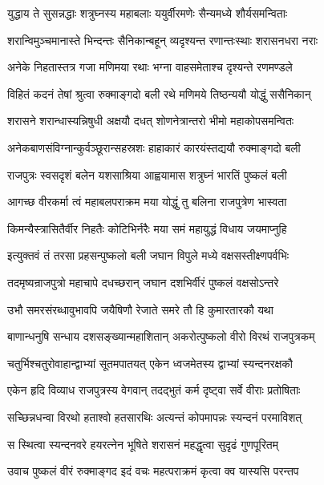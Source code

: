 

\twolineshloka
{युद्धाय ते सुसन्नद्धाः शत्रुघ्नस्य महाबलाः}
{ययुर्वीरमणेः सैन्यमध्ये शौर्यसमन्विताः}%

\twolineshloka
{शरान्विमुञ्चमानास्ते भिन्दन्तः सैनिकान्बहून्}
{व्यदृश्यन्त रणान्तःस्थाः शरासनधरा नराः}%

\twolineshloka
{अनेके निहतास्तत्र गजा मणिमया रथाः}
{भग्ना वाहसमेताश्च दृश्यन्ते रणमण्डले}%

\twolineshloka
{विहितं कदनं तेषां श्रुत्वा रुक्माङ्गदो बली}
{रथे मणिमये तिष्ठन्ययौ योद्धुं ससैनिकान्}%

\twolineshloka
{शरासने शरान्धास्यन्निषुधी अक्षयौ दधत्}
{शोणनेत्रान्तरो भीमो महाकोपसमन्वितः}%

\twolineshloka
{अनेकबाणसंविग्नान्कुर्वञ्छूरान्सहस्रशः}
{हाहाकारं कारयंस्तद्ययौ रुक्माङ्गदो बली}%

\twolineshloka
{राजपुत्रः स्वसदृशं बलेन यशसाश्रिया}
{आह्वयामास शत्रुघ्नं भारतिं पुष्कलं बली}%


\twolineshloka
{आगच्छ वीरकर्मा त्वं महाबलपराक्रम}
{मया योद्धुं तु बलिना राजपुत्रेण भास्वता}%

\twolineshloka
{किमन्यैस्त्रासितैर्वीर निहतैः कोटिभिर्नरैः}
{मया समं महायुद्धं विधाय जयमाप्नुहि}%

\twolineshloka
{इत्युक्तवं तं तरसा प्रहसन्पुष्कलो बली}
{जघान विपुले मध्ये वक्षसस्तीक्ष्णपर्वभिः}%

\twolineshloka
{तदमृष्यन्राजपुत्रो महाचापे दधच्छरान्}
{जघान दशभिर्वीरं पुष्कलं वक्षसोऽन्तरे}%

\twolineshloka
{उभौ समरसंरब्धावुभावपि जयैषिणौ}
{रेजाते समरे तौ हि कुमारतारकौ यथा}%

\twolineshloka
{बाणान्धनुषि सन्धाय दशसङ्ख्यान्महाशितान्}
{अकरोत्पुष्कलो वीरो विरथं राजपुत्रकम्}%

\twolineshloka
{चतुर्भिश्चतुरोवाहान्द्वाभ्यां सूतमपातयत्}
{एकेन ध्वजमेतस्य द्वाभ्यां स्यन्दनरक्षकौ}%

\twolineshloka
{एकेन हृदि विव्याध राजपुत्रस्य वेगवान्}
{तदद्भुतं कर्म दृष्ट्वा सर्वे वीराः प्रतोषिताः}%

\twolineshloka
{सच्छिन्नधन्वा विरथो हताश्वो हतसारथिः}
{अत्यन्तं कोपमापन्नः स्यन्दनं परमाविशत्}%

\twolineshloka
{स स्थित्वा स्यन्दनवरे हयरत्नेन भूषिते}
{शरासनं महद्धृत्वा सुदृढं गुणपूरितम्}%

\twolineshloka
{उवाच पुष्कलं वीरं रुक्माङ्गद इदं वचः}
{महत्पराक्रमं कृत्वा क्व यास्यसि परन्तप}%

